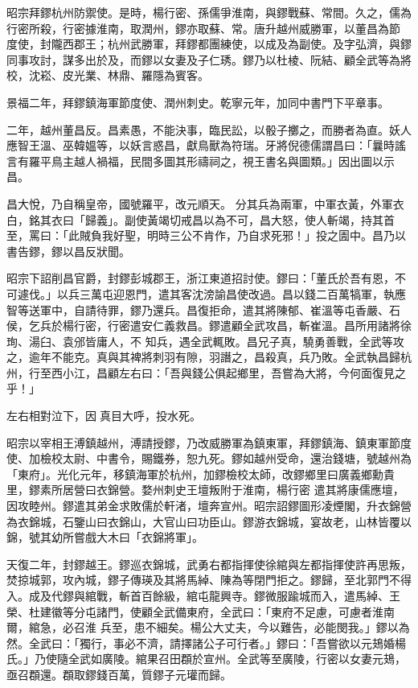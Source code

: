 \begin{pinyinscope}
 昭宗拜鏐杭州防禦使。是時，楊行密、孫儒爭淮南，與鏐戰蘇、常間。久之，儒為行密所殺，行密據淮南，取潤州，鏐亦取蘇、常。唐升越州威勝軍，以董昌為節
 度使，封隴西郡王；杭州武勝軍，拜鏐都團練使，以成及為副使。及字弘濟，與鏐同事攻討，謀多出於及，而鏐以女妻及子仁琇。鏐乃以杜棱、阮結、顧全武等為將校，沈崧、皮光業、林鼎、羅隱為賓客。



 景福二年，拜鏐鎮海軍節度使、潤州刺史。乾寧元年，加同中書門下平章事。



 二年，越州董昌反。昌素愚，不能決事，臨民訟，以骰子擲之，而勝者為直。妖人應智王溫、巫韓媼等，以妖言惑昌，獻鳥獸為符瑞。牙將倪德儒謂昌曰：「曩時謠言有羅平鳥主越人禍福，民間多圖其形禱祠之，視王書名與圖類。」因出圖以示昌。



 昌大悅，乃自稱皇帝，國號羅平，改元順天。
 分其兵為兩軍，中軍衣黃，外軍衣白，銘其衣曰「歸義」。副使黃竭切戒昌以為不可，昌大怒，使人斬竭，持其首至，罵曰：「此賊負我好聖，明時三公不肯作，乃自求死邪！」投之圊中。昌乃以書告鏐，鏐以昌反狀聞。



 昭宗下詔削昌官爵，封鏐彭城郡王，浙江東道招討使。鏐曰：「董氏於吾有恩，不可遽伐。」以兵三萬屯迎恩門，遣其客沈滂諭昌使改過。昌以錢二百萬犒軍，執應智等送軍中，自請待罪，鏐乃還兵。昌復拒命，遣其將陳郁、崔溫等屯香嚴、石侯，乞兵於楊行密，行密遣安仁義救昌。鏐遣顧全武攻昌，斬崔溫。昌所用諸將徐珣、湯臼、袁邠皆庸人，不
 知兵，遇全武輒敗。昌兄子真，驍勇善戰，全武等攻之，逾年不能克。真與其裨將刺羽有隙，羽譖之，昌殺真，兵乃敗。全武執昌歸杭州，行至西小江，昌顧左右曰：「吾與錢公俱起鄉里，吾嘗為大將，今何面復見之乎！」



 左右相對泣下，因真目大呼，投水死。



 昭宗以宰相王溥鎮越州，溥請授鏐，乃改威勝軍為鎮東軍，拜鏐鎮海、鎮東軍節度使、加檢校太尉、中書令，賜鐵券，恕九死。鏐如越州受命，還治錢塘，號越州為「東府」。光化元年，移鎮海軍於杭州，加鏐檢校太師，改鏐鄉里曰廣義鄉勳貴里，鏐素所居營曰衣錦營。婺州刺史王壇叛附于淮南，楊行密
 遣其將康儒應壇，因攻睦州。鏐遣其弟金求敗儒於軒渚，壇奔宣州。昭宗詔鏐圖形凌煙閣，升衣錦營為衣錦城，石鑒山曰衣錦山，大官山曰功臣山。鏐游衣錦城，宴故老，山林皆覆以錦，號其幼所嘗戲大木曰「衣錦將軍」。



 天復二年，封鏐越王。鏐巡衣錦城，武勇右都指揮使徐綰與左都指揮使許再思叛，焚掠城郭，攻內城，鏐子傳瑛及其將馬綽、陳為等閉門拒之。鏐歸，至北郭門不得入。成及代鏐與綰戰，斬首百餘級，綰屯龍興寺。鏐微服踰城而入，遣馬綽、王榮、杜建徽等分屯諸門，使顧全武備東府，全武曰：「東府不足慮，可慮者淮南爾，綰急，必召淮
 兵至，患不細矣。楊公大丈夫，今以難告，必能閔我。」鏐以為然。全武曰：「獨行，事必不濟，請擇諸公子可行者。」鏐曰：「吾嘗欲以元鳷婚楊氏。」乃使隨全武如廣陵。綰果召田頵於宣州。全武等至廣陵，行密以女妻元鳷，亟召頵還。頵取鏐錢百萬，質鏐子元瓘而歸。




\end{pinyinscope}
